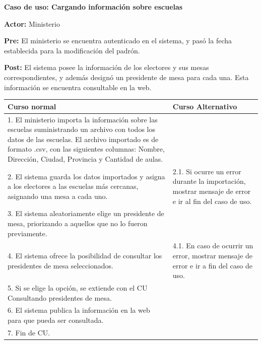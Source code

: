 \textbf{Caso de uso: Cargando información sobre escuelas}

\textbf{Actor:} Ministerio

\textbf{Pre:} El ministerio se encuentra autenticado en el sistema, y pasó la fecha establecida para la modificación del padrón.

\textbf{Post:} El sistema posee la información de los electores y sus mesas correspondientes, y además designó un presidente de mesa para cada una. Esta información se encuentra consultable en la web.


\begin{table}[h!]
	
 \begin{tabular}{|p{7.5cm} | p{7.5cm}|} 
 \hline
 \textbf{Curso normal} & \textbf{Curso Alternativo} \\
 \hline

1. El ministerio importa la información sobre las escuelas suministrando un archivo con todos los datos de las escuelas. El archivo importado es de formato .csv, con las siguientes columnas: Nombre, Dirección, Ciudad, Provincia y Cantidad de aulas. & \\
\hline

2. El sistema guarda los datos importados y asigna a los electores a las escuelas más cercanas, asignando una mesa a cada uno. &
2.1. Si ocurre un error durante la importación, mostrar mensaje de error e ir al fin del caso de uso. \\
\hline
3. El sistema aleatoriamente elige un presidente de mesa, priorizando a aquellos que no lo fueron previamente. & \\
\hline

4. El sistema ofrece la posibilidad de consultar los presidentes de mesa seleccionados. &
4.1. En caso de ocurrir un error, mostrar mensaje de error e ir a fin del caso de uso. \\
\hline
5. Si se elige la opción, se extiende con el CU Consultando presidentes de mesa. & \\
\hline

6. El sistema publica la información en la web para que pueda ser consultada. & \\
\hline

7. Fin de CU. & \\
\hline

 \end{tabular}

\end{table}






